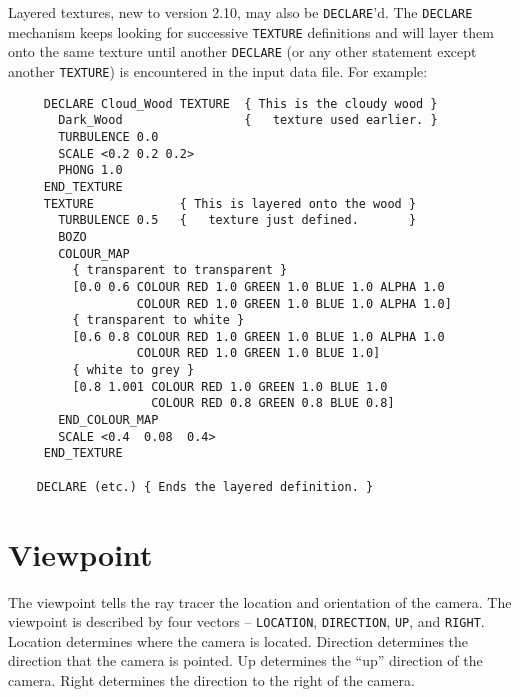 Layered textures, new to version 2.10, may also be {\tt DECLARE}'d.
The {\tt DECLARE} mechanism keeps looking for successive {\tt TEXTURE}
definitions and will layer them onto the same texture until another
{\tt DECLARE} (or any other statement except another {\tt TEXTURE}) is
encountered in the input data file.
For example:
\begin{verbatim}
     DECLARE Cloud_Wood TEXTURE  { This is the cloudy wood }
       Dark_Wood                 {   texture used earlier. }
       TURBULENCE 0.0
       SCALE <0.2 0.2 0.2>
       PHONG 1.0
     END_TEXTURE
     TEXTURE            { This is layered onto the wood }
       TURBULENCE 0.5   {   texture just defined.       }
       BOZO
       COLOUR_MAP
         { transparent to transparent }
         [0.0 0.6 COLOUR RED 1.0 GREEN 1.0 BLUE 1.0 ALPHA 1.0
                  COLOUR RED 1.0 GREEN 1.0 BLUE 1.0 ALPHA 1.0]
         { transparent to white }
         [0.6 0.8 COLOUR RED 1.0 GREEN 1.0 BLUE 1.0 ALPHA 1.0
                  COLOUR RED 1.0 GREEN 1.0 BLUE 1.0]
         { white to grey }
         [0.8 1.001 COLOUR RED 1.0 GREEN 1.0 BLUE 1.0
                    COLOUR RED 0.8 GREEN 0.8 BLUE 0.8]
       END_COLOUR_MAP
       SCALE <0.4  0.08  0.4>
     END_TEXTURE

    DECLARE (etc.) { Ends the layered definition. }
\end{verbatim}

\section{Viewpoint}

The viewpoint tells the ray tracer the location and orientation of the
camera.  The viewpoint is described by four vectors --
{\tt LOCATION},
{\tt DIRECTION},
{\tt UP}, and
{\tt RIGHT}.
Location determines where the camera is
located.  Direction determines the direction that the camera is
pointed.  Up determines the ``up'' direction of the camera.  Right
determines the direction to the right of the camera.

